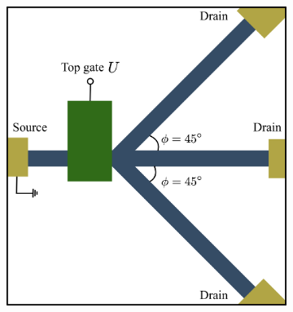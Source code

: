 
    \begin{figure}[H] 
        \centering
        \begin{subfigure}[b]{0.45\linewidth}
            \includegraphics[width=\linewidth]{fig/3 arm structure.png}
            \caption{}
            \label{fig:3 arms}
        \end{subfigure}
        \begin{subfigure}[b]{0.3\linewidth}

\end{subfigure}
\end{figure}
